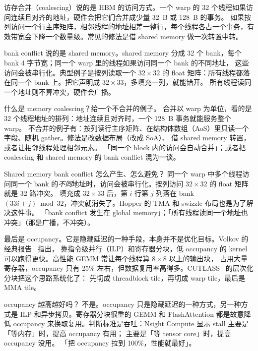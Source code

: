 访存合并（coalescing）说的是 HBM 的访问方式。一个 warp 的 32 个线程如果访问连续且对齐的地址，硬件会把它们合并成少量 32~B 或 128~B 的事务。
如果按列访问一个行主序矩阵，相邻线程的地址相差一整行，每个线程各占一个事务，有效带宽会下降一个数量级。常见的修法是借 shared memory 做一次转置中转。

bank conflict 说的是 shared memory。shared memory 分成 32 个 bank，每个 bank 4 字节宽；同一个 warp 里的线程如果访问同一个 bank 的不同地址，
这些访问会被串行化。典型例子是按列读取一个 $32\times32$ 的 float 矩阵：所有线程都落在同一个 bank 上。把它声明成 $32\times33$，多填充一列，就能错开。
所有线程读同一个地址则不算冲突，硬件会广播。

\begin{qa}{什么是 memory coalescing？给一个不合并的例子。}
\ans 合并以 warp 为单位，看的是 32 个线程地址的排列：地址连续且对齐时，一个 128~B 事务就能服务整个 warp。
不合并的例子有：按列读行主序矩阵、在结构体数组（AoS）里只读一个字段、随机 gather。修法是改数据布局（改成 SoA）、
借 shared memory 转置，或者让相邻线程处理相邻元素。
\wrong 「同一个 block 内的访问会自动合并」；或者把 coalescing 和 shared memory 的 bank conflict 混为一谈。
\end{qa}

\begin{qa}{Shared memory bank conflict 怎么产生、怎么避免？}
\ans 同一个 warp 中多个线程访问同一个 bank 的\emph{不同}地址时，访问会被串行化。按列访问 $32\times32$ 的 float 矩阵就是 32 路冲突。
填充成 $32\times33$ 后，第 $i$ 行第 $j$ 列落在 bank $(33i+j)\bmod 32$，冲突就消失了。Hopper 的 TMA 和 swizzle 布局也是为了解决这件事。
\wrong 「bank conflict 发生在 global memory」；「所有线程读同一个地址也冲突」（那是广播，不冲突）。
\end{qa}

最后是 occupancy。它是隐藏延迟的一种手段，本身并不是优化目标。Volkov 的经典报告~\cite{volkov2010better} 指出，
靠指令级并行（ILP）和寄存器分块，低 occupancy 的 kernel 可以跑得更快。高性能 GEMM 常让每个线程算 $8\times8$ 以上的输出块，
占用大量寄存器，occupancy 只有 25\% 左右，但数据复用率高得多。CUTLASS~\cite{cutlass} 的层次化分块把这个思路系统化了：
先切成 threadblock tile，再切成 warp tile，最后是 MMA tile。

\begin{qa}{occupancy 越高越好吗？}
\ans 不是。occupancy 只是隐藏延迟的一种方式，另一种方式是 ILP 和异步拷贝。寄存器分块很重的 GEMM 和 FlashAttention
都是故意降低 occupancy 来换取复用。判断标准是吞吐：Nsight Compute 显示 stall 主要是「等内存」时，提高 occupancy 有用；
主要是「等 tensor core」时，提高 occupancy 没用。
\wrong 「把 occupancy 拉到 100\%，性能就最好」。
\end{qa}

